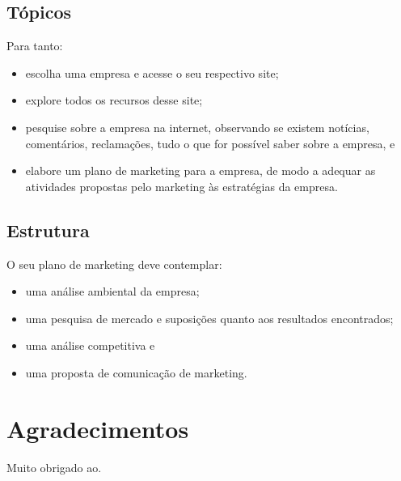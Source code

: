 \documentclass[a4paper]{article}
\begin{document}
\subsection{Tópicos}
Para tanto:
\begin{itemize}
    \item escolha uma empresa e acesse o seu respectivo site;
    \item explore todos os recursos desse site;
    \item pesquise sobre a empresa na internet, observando se existem notícias, comentários, reclamações, tudo o que for possível saber sobre a empresa, e
    \item elabore um plano de marketing para a empresa, de modo a adequar as atividades propostas pelo marketing às estratégias da empresa.
\end{itemize}

\subsection{Estrutura}

O seu plano de marketing deve contemplar:
\begin{itemize}
    \item uma análise ambiental da empresa;
    \item uma pesquisa de mercado e suposições quanto aos resultados encontrados;
    \item uma análise competitiva e
    \item uma proposta de comunicação de marketing. 
\end{itemize}

\section{Agradecimentos}
Muito obrigado ao. 



\end{document}
